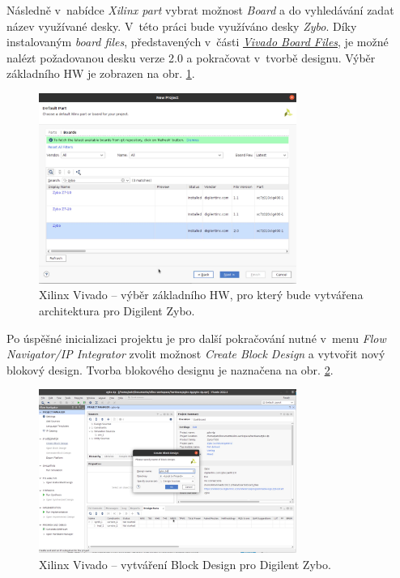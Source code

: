 \documentclass[a4paper, twoside, 11pt]{article}
\begin{document}
\begin{appendices}
		Následně v~nabídce \textit{Xilinx part} vybrat možnost \textit{Board} a do vyhledávání zadat název využívané desky. V~této práci bude využíváno desky \textit{Zybo}. Díky instalovaným \textit{board files}, představených v~části \hyperref[subsec:vivado-board-files]{\textit{Vivado Board Files}}, je možné nalézt požadovanou desku verze 2.0 a pokračovat v~tvorbě designu. Výběr základního HW je zobrazen na obr. \ref{fig:zybo-xilinx-vivado-flow-02}.

		\begin{figure}[htbp!]
			\centering
			\includegraphics[width=0.75\textwidth]{src/png/zybo-xilinx-vivado-flow/zybo-xilinx-vivado-flow-02.jpg}
			\caption{Xilinx Vivado – výběr základního HW, pro který bude vytvářena architektura pro Digilent Zybo.}
			\label{fig:zybo-xilinx-vivado-flow-02}
		\end{figure}
		
		Po úspěšné inicializaci projektu je pro další pokračování nutné v~menu \textit{Flow Navigator/IP Integrator} zvolit možnost \textit{Create Block Design} a vytvořit nový blokový design. Tvorba blokového designu je naznačena na obr. \ref{fig:zybo-xilinx-vivado-flow-05}.
		
		\begin{figure}[htbp!]
			\centering
			\includegraphics[width=0.75\textwidth]{src/png/zybo-xilinx-vivado-flow/zybo-xilinx-vivado-flow-05.jpg}
			\caption{Xilinx Vivado – vytváření Block Design pro Digilent Zybo.}
			\label{fig:zybo-xilinx-vivado-flow-05}
		\end{figure}


\end{appendices}
\end{document}
